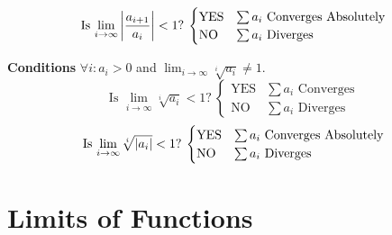 \documentclass{article}
\theoremstyle{plain}
\numberwithin{theorem}{subsection}
\theoremstyle{definition}
\numberwithin{definition}{subsection}
\theoremstyle{remark}
\numberwithin{note}{subsection}
\begin{document}
\begin{multicols}{2}
\begin{mdframed}[style=exampledefaultcols,frametitle={Ratio Test}]
        \begin{equation*}
            \text{Is $\lim_{i\to\infty}\abs{\frac{a_{i+1}}{a_i}} < 1$?}\:
            \begin{cases}
                \text{YES} & \text{$\sum a_i$ Converges Absolutely} \\
                \text{NO}  & \text{$\sum a_i$ Diverges}
            \end{cases}
        \end{equation*}
    \end{mdframed}
    \begin{mdframed}[style=exampledefaultcols,frametitle={Root Test}]
        \textbf{Conditions} $\forall i:a_i>0$ and $\displaystyle \lim_{i\to\infty}\sqrt[i]{a_i}\neq 1$.
        \begin{equation*}
            \text{Is $\lim_{i\to\infty}\sqrt[i]{a_i} < 1$?}\:
            \begin{cases}
                \text{YES} & \text{$\sum a_i$ Converges} \\
                \text{NO}  & \text{$\sum a_i$ Diverges}
            \end{cases}
        \end{equation*}
        \begin{equation*}
            \text{Is $\lim_{i\to\infty}\sqrt[i]{\abs{a_i}} < 1$?}\:
            \begin{cases}
                \text{YES} & \text{$\sum a_i$ Converges Absolutely} \\
                \text{NO}  & \text{$\sum a_i$ Diverges}
            \end{cases}
        \end{equation*}
    \end{mdframed}
\end{multicols}
\pagebreak
%
\section{Limits of Functions}
\end{document}
